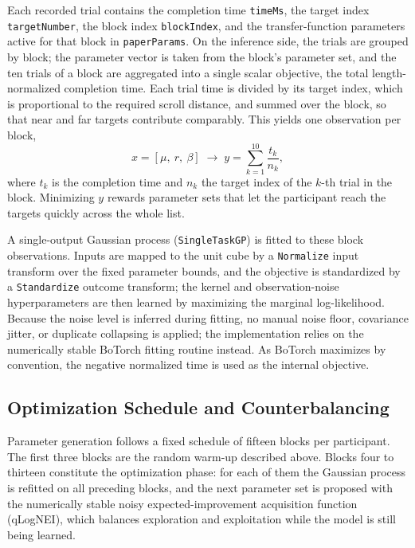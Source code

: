 \documentclass[12pt,a4paper]{report}
\begin{document}
        Each recorded trial contains the completion time \texttt{timeMs}, the target index \texttt{targetNumber}, the block index \texttt{blockIndex}, and the transfer-function parameters active for that block in \texttt{paperParams}. On the inference side, the trials are grouped by block; the parameter vector is taken from the block's parameter set, and the ten trials of a block are aggregated into a single scalar objective, the total length-normalized completion time. Each trial time is divided by its target index, which is proportional to the required scroll distance, and summed over the block, so that near and far targets contribute comparably. This yields one observation per block,
        \begin{equation}
            x = [\mu,\ r,\ \beta] \;\longrightarrow\; y = \sum_{k=1}^{10} \frac{t_k}{n_k},
            \label{eq:sd-scalar-objective}
        \end{equation}
        where $t_k$ is the completion time and $n_k$ the target index of the $k$-th trial in the block. Minimizing $y$ rewards parameter sets that let the participant reach the targets quickly across the whole list.

        A single-output Gaussian process (\texttt{SingleTaskGP}) is fitted to these block observations. Inputs are mapped to the unit cube by a \texttt{Normalize} input transform over the fixed parameter bounds, and the objective is standardized by a \texttt{Standardize} outcome transform; the kernel and observation-noise hyperparameters are then learned by maximizing the marginal log-likelihood. Because the noise level is inferred during fitting, no manual noise floor, covariance jitter, or duplicate collapsing is applied; the implementation relies on the numerically stable BoTorch fitting routine instead. As BoTorch maximizes by convention, the negative normalized time is used as the internal objective.

        \subsection{Optimization Schedule and Counterbalancing}

        Parameter generation follows a fixed schedule of fifteen blocks per participant. The first three blocks are the random warm-up described above. Blocks four to thirteen constitute the optimization phase: for each of them the Gaussian process is refitted on all preceding blocks, and the next parameter set is proposed with the numerically stable noisy expected-improvement acquisition function (qLogNEI), which balances exploration and exploitation while the model is still being learned.
\end{document}
